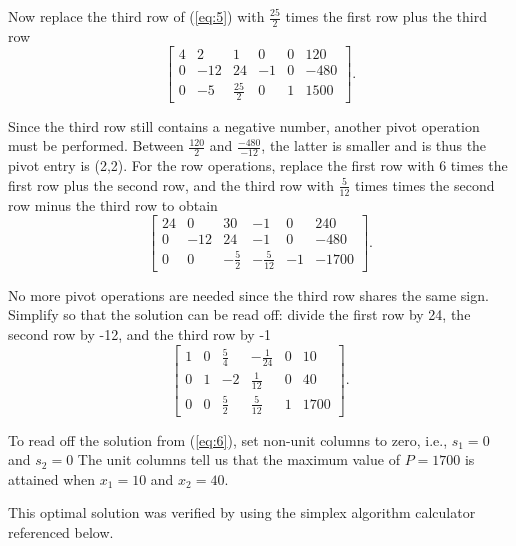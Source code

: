 \documentclass[letterpaper,11pt]{article}
\begin{document}
\noindent Now replace the third row of (\ref{eq:5}) with $\frac{25}{2}$ times the first row plus the third row
\begin{equation*}
\begin{bmatrix}
4 & 2 & 1 & 0 & 0 & 120\\
0 & -12 & 24 & -1 & 0 & -480\\
0 & -5 & \frac{25}{2} & 0 & 1 & \num[group-separator={,}]{1500}
\end{bmatrix}.
\end{equation*}

\noindent Since the third row still contains a negative number, another pivot operation must be performed. Between $\frac{120}{2}$ and $\frac{-480}{-12}$, the latter is smaller and is thus the pivot entry is (2,2). For the row operations, replace the first row with 6 times the first row plus the second row, and the third row with $\frac{5}{12}$ times times the second row minus the third row to obtain
\begin{equation*}
\begin{bmatrix}
24 & 0 & 30 & -1 & 0 & 240\\
0 & -12 & 24 & -1 & 0 & -480\\
0 & 0 & -\frac{5}{2} & -\frac{5}{12} & -1 & \num[group-separator={,}]{-1700}
\end{bmatrix}.
\end{equation*}

\noindent No more pivot operations are needed since the third row shares the same sign. Simplify so that the solution can be read off: divide the first row by 24, the second row by -12, and the third row by -1
\begin{equation}
\begin{bmatrix} \label{eq:6}
1 & 0 & \frac{5}{4} & -\frac{1}{24} & 0 & 10\\
0 & 1 & -2 & \frac{1}{12} & 0 & 40\\
0 & 0 & \frac{5}{2} & \frac{5}{12} & 1 & \num[group-separator={,}]{1700}
\end{bmatrix}.
\end{equation}

\noindent To read off the solution from (\ref{eq:6}), set non-unit columns to zero, i.e., $s_{1} = 0$ and $s_{2} = 0$ The unit columns tell us that the maximum value of $P = \num[group-separator={,}]{1700}$ is attained when $x_{1} = 10$ and $x_{2} = 40$. \vspace{3mm}

\noindent This optimal solution was verified by using the simplex algorithm calculator referenced below.
\end{document}
